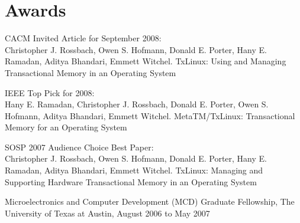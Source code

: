\section{Awards}
%
CACM Invited Article for September 2008: \\
Christopher J. Rossbach,
Owen S. Hofmann, Donald E. Porter, Hany E. Ramadan, Aditya Bhandari,
Emmett Witchel. TxLinux: Using and Managing Transactional Memory in
an Operating System

\bigskip

IEEE Top Pick for 2008: \\
Hany E. Ramadan, Christopher J. Rossbach, Donald E. Porter,
Owen S. Hofmann, Aditya Bhandari, Emmett Witchel.
MetaTM/TxLinux: Transactional Memory for an Operating System

\bigskip

SOSP 2007 Audience Choice Best Paper: \\
Christopher J. Rossbach,
Owen S. Hofmann, Donald E. Porter, Hany E. Ramadan, Aditya Bhandari,
Emmett Witchel. 
TxLinux: Managing and Supporting Hardware Transactional Memory in an
Operating
System

\bigskip

Microelectronics and Computer Development (MCD) Graduate Fellowship,
The University of Texas at Austin, August 2006 to May 2007
